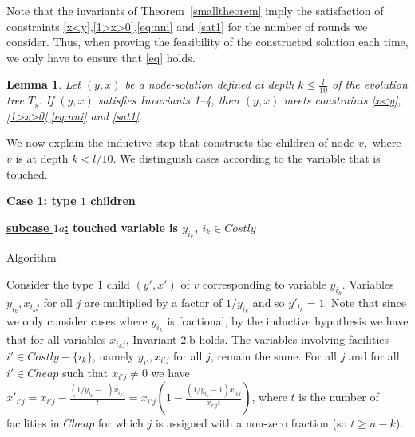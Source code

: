 \documentclass[11pt]{article}\usepackage{amsmath}
\makeatletter
\newtheorem{lemma}{Lemma}[section]
\newenvironment{oneshot}[1]{\@beginlemma{#1}{\unskip}}{\@endlemma}
\makeatother
\begin{document}
Note  that  the  invariants of    Theorem~\ref{smalltheorem}  imply the  satisfaction  of
constraints  \eqref{x<y},\eqref{1>x>0},\eqref{eq:nni} and  \eqref{sat1}  for the
number  of  rounds  we consider.  Thus,  when  proving  the feasibility  of  the
constructed solution each time, we only have to ensure that \eqref{eq} holds.




\iffalse ---------------- One shot TRICK BELOW Didn't work
\begin{oneshot}{Lemma~\ref{easyconstraints2}}
Let  $(y,x)$  be a node-solution defined  at   depth  $k\leq
\frac{l}{10}$ of the evolution tree $T_s.$  If $(y,x)$ satisfies
Invariants 1--4, then $(y,x)$ meets 
constraints \eqref{x<y},\eqref{1>x>0},\eqref{eq:nni} and \eqref{sat1}.
\end{oneshot}


\newtheorem*{thm:associativity}{Theorem \ref{thm:associativity}}
\begin{thm:associativity}
Lorem ipsum ...
\end{thm:associativity}

---------------- \fi  





 
\begin{lemma}\label{easyconstraints2}
Let  $(y,x)$  be a node-solution defined  at   depth  $k\leq
\frac{l}{10}$ of the evolution tree $T_s.$  If $(y,x)$ satisfies
Invariants 1--4, then $(y,x)$ meets 
constraints \eqref{x<y},\eqref{1>x>0},\eqref{eq:nni} and \eqref{sat1}.
\end{lemma}





We now explain the  inductive step that constructs the children of
node $v,$ where $v$ is at depth $k < l/10.$ We  distinguish  cases according to the
variable that is touched. 

\medskip
\noindent
{\bf Case 1: type $1$ children}

\noindent 
{\bf \underline{subcase $1a$:} touched variable is  $y_{i_k}$, $i_k \in Costly$}

{\sc Algorithm}

Consider the type $1$ child $(y',x')$ of $v$ corresponding to variable $y_{i_k}$. Variables $y_{i_k},x_{i_kj}$ for all $j$ are multiplied by a factor of $1/y_{i_k}$ and so  $y'_{i_k}=1$.
Note that since we only consider cases where $y_{i_k}$ is fractional, by 
the inductive hypothesis we have that for all variables $x_{i_kj}$, Invariant 2.b holds.
The variables involving facilities $i' \in Costly-\{i_k\}$, namely $y_{i'},x_{i'j}$ for all $j$, remain the same.  For all $j$ and for all $i' \in Cheap$ such that $x_{i'j}\neq 0$  we have $x'_{i'j}=x_{i'j}-\frac{(1/y_{i_k}-1)x_{i_kj}}{t}=x_{i'j}(1-\frac{(1/y_{i_k}-1)x_{i_kj}}{x_{i'j}t})$, where $t$ is
the number of facilities in $Cheap$ for which $j$ is assigned with a non-zero fraction (so $t \geq n-k$).
\end{document}
